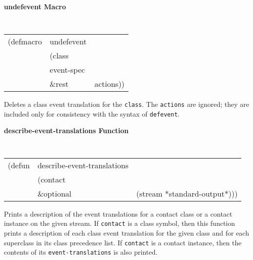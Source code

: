 \documentclass[twoside]{book}
\begin{document}
\begin{sloppy}
\begin{flushright}
{}\end{flushright}

{\large {\bf undefevent \hfill Macro}} 
\begin{flushright} \parbox[t]{6.125in}{
\tt
\begin{tabular}{lll}
\raggedright
(defmacro & undefevent \\ 
& (class\\
&  event-spec\\
& \&rest & actions))
\end{tabular}
\rm

}\end{flushright}

\begin{flushright} \parbox[t]{6.125in}{
Deletes a class event translation for the {\tt class}.
The {\tt actions} are ignored; they are included only for consistency with the
syntax  of {\tt defevent}. }\end{flushright}

{\samepage
{\large {\bf describe-event-translations \hfill Function}} 
\begin{flushright} \parbox[t]{6.125in}{
\tt
\begin{tabular}{lll}
\raggedright
(defun & describe-event-translations \\ 
& (contact\\
&  \&optional & (stream *standard-output*)))
\end{tabular}
\rm

}\end{flushright}}


\begin{flushright} \parbox[t]{6.125in}{
Prints a description of the event translations for a contact class or a contact
instance on the given stream. If {\tt contact} is a class symbol, then this
function prints a description of each class event translation for the given class
and for each superclass in its class precedence list. If {\tt contact} is a
contact instance, then the contents of its {\tt event-translations} is also
printed.

}\end{flushright}



\end{sloppy}
\end{document}
